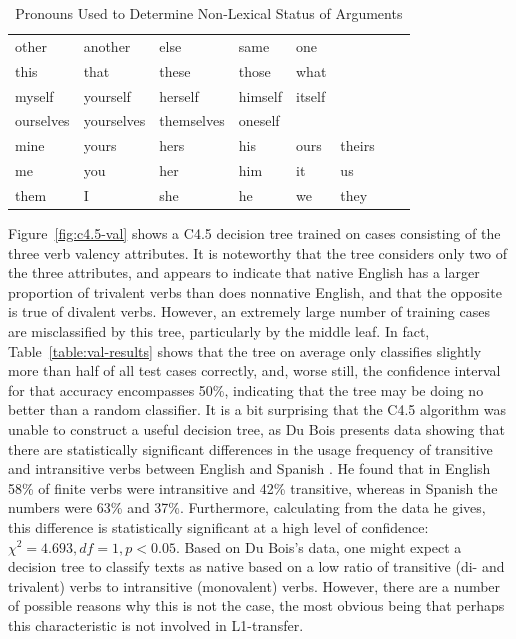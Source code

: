 \documentclass[main.tex]{subfiles}
\begin{document}
\begin{table}[ht]
\small
\centering
\caption{Pronouns Used to Determine Non-Lexical Status of Arguments}
\begin{tabular}{ l l l l l l l l }
\toprule

other & another & else & same & one \\
this & that & these & those & what \\
myself & yourself & herself & himself & itself \\
ourselves & yourselves &themselves & oneself \\
mine & yours & hers & his & ours & theirs \\
me & you & her & him & it & us \\
them & I & she & he & we & they \\

\bottomrule
\end{tabular}
\label{table:pronouns}
\end{table}

Figure~\ref{fig:c4.5-val} shows a C4.5 decision tree trained on cases consisting of the three verb valency attributes. It is noteworthy that the tree considers only two of the three attributes, and appears to indicate that native English has a larger proportion of trivalent verbs than does nonnative English, and that the opposite is true of divalent verbs. However, an extremely large number of training cases are misclassified by this tree, particularly by the middle leaf. In fact, Table~\ref{table:val-results} shows that the tree on average only classifies slightly more than half of all test cases correctly, and, worse still, the confidence interval for that accuracy encompasses 50\%, indicating that the tree may be doing no better than a random classifier. It is a bit surprising that the C4.5 algorithm was unable to construct a useful decision tree, as Du Bois presents data showing that there are statistically significant differences in the usage frequency of transitive and intransitive verbs between English and Spanish \citep[Table~2.3]{dubois:2003}. He found that in English 58\% of finite verbs were intransitive and 42\% transitive, whereas in Spanish the numbers were 63\% and 37\%. Furthermore, calculating from the data he gives, this difference is statistically significant at a high level of confidence: $\chi^2=4.693, df=1, p<0.05$. Based on Du Bois's data, one might expect a decision tree to classify texts as native based on a low ratio of transitive (di- and trivalent) verbs to intransitive (monovalent) verbs. However, there are a number of possible reasons why this is not the case, the most obvious being that perhaps this characteristic is not involved in L1-transfer.
\end{document}
